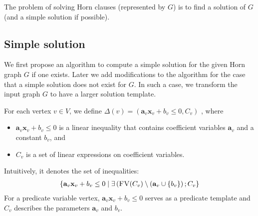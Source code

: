 \documentclass[a4paper,12pt]{article}
\begin{document}
The problem of solving Horn clauses (represented by $G$) is to find a
solution of $G$ (and a simple solution if possible).

\subsection{Simple solution}

We first propose an algorithm to compute a simple solution for the
given Horn graph $G$ if one exists.  Later we add modifications to the
algorithm for the case that a simple solution does not exist for $G$.
In such a case, we transform the input graph $G$ to have a larger
solution template.

For each vertex $v \in V$, we define
$\Delta(v) = (\mathbf{a}_v \mathbf{x}_v + b_v \leq 0, C_v)$
, where
\begin{itemize}
\item $\mathbf{a}_v \mathbf{x}_v + b_v \leq 0$ is a linear inequality that
  contains coefficient variables $\mathbf{a}_v$ and a constant $b_v$,
  and
\item $C_v$ is a set of linear expressions on coefficient variables.
\end{itemize}
Intuitively, it denotes the set of inequalities:
\begin{align*}
\left\lbrace
 \mathbf{a}_v \mathbf{x}_v + b_v \leq 0 \mid
 \exists \left( \textsc{FV}(C_v)
  \setminus (\mathbf{a}_v \cup \left\lbrace b_v \right\rbrace
 \right); C_v
\right\rbrace
\end{align*}
For a predicate variable vertex, $\mathbf{a}_v \mathbf{x}_v + b_v \leq
0$ serves as a predicate template and $C_v$ describes the parameters
$\mathbf{a}_v$ and $b_v$.
\end{document}
